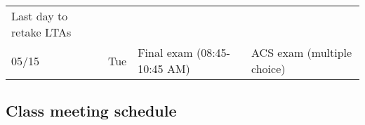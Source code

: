 \begin{longtable}[]{@{}llll@{}}
\begin{minipage}[t]{0.43\columnwidth}
Last day to retake LTAs\strut
\end{minipage} & \begin{minipage}[t]{0.38\columnwidth}\raggedright
\strut
\end{minipage}\tabularnewline
\begin{minipage}[t]{0.05\columnwidth}\raggedright
05/15\strut
\end{minipage} & \begin{minipage}[t]{0.03\columnwidth}\raggedright
Tue\strut
\end{minipage} & \begin{minipage}[t]{0.43\columnwidth}\raggedright
Final exam (08:45-10:45 AM)\strut
\end{minipage} & \begin{minipage}[t]{0.38\columnwidth}\raggedright
ACS exam (multiple choice)\strut
\end{minipage}\tabularnewline
\bottomrule
\end{longtable}

\hypertarget{class-meeting-schedule}{%
\subsection{Class meeting schedule}\label{class-meeting-schedule}}

